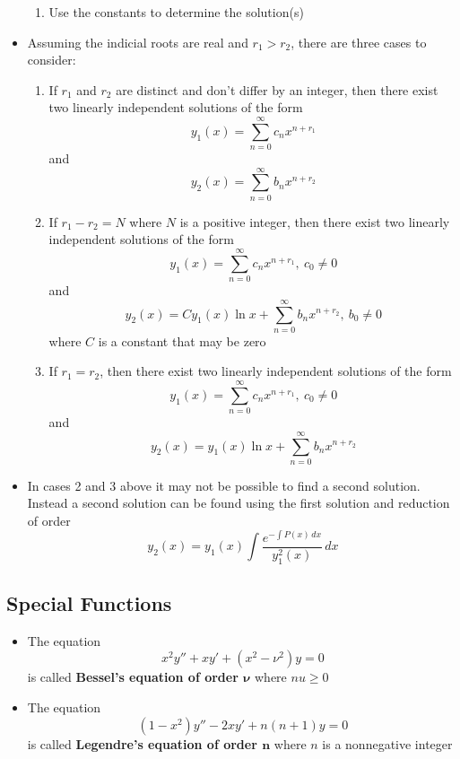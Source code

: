 \documentclass{article}
\begin{document}
\begin{itemize}
\begin{enumerate}
          \item Use the constants to determine the solution(s)
        \end{enumerate}

  \item Assuming the indicial roots are real and $r_1 > r_2$, there are three cases to consider:

        \begin{enumerate}
          \item If $r_1$ and $r_2$ are distinct and don't differ by an integer, then there exist two linearly independent solutions of the form \[y_1(x) = \sum_{n = 0}^\infty c_n x^{n + r_1}\] and \[y_2(x) = \sum_{n = 0}^\infty b_n x^{n + r_2}\]

          \item If $r_1 - r_2 = N$ where $N$ is a positive integer, then there exist two linearly independent solutions of the form \[y_1(x) = \sum_{n = 0}^\infty c_n x^{n + r_1}, \: c_0 \ne 0\] and \[y_2(x) = C y_1(x) \ln x + \sum_{n = 0}^\infty b_n x^{n + r_2}, \: b_0 \ne 0\] where $C$ is a constant that may be zero

          \item If $r_1 = r_2$, then there exist two linearly independent solutions of the form \[y_1(x) = \sum_{n = 0}^\infty c_n x^{n + r_1}, \: c_0 \ne 0\] and \[y_2(x) = y_1(x) \ln x + \sum_{n = 0}^\infty b_n x^{n + r_2}\]
        \end{enumerate}

  \item In cases 2 and 3 above it may not be possible to find a second solution. Instead a second solution can be found using the first solution and reduction of order \[y_2(x) = y_1(x) \int \frac{e^{-\int P(x) \,dx}}{y_1^2(x)} \,dx\]
\end{itemize}

\subsection{Special Functions}

\begin{itemize}
  \item The equation \[x^2 y'' + x y' + (x^2 - \nu^2) y = 0\] is called \textbf{Bessel's equation of order $\boldsymbol{\nu}$} where $nu \ge 0$

  \item The equation \[(1 - x^2) y'' - 2 x y' + n (n + 1) y = 0\] is called \textbf{Legendre's equation of order $\boldsymbol{n}$} where $n$ is a nonnegative integer
\end{itemize}
\end{document}
